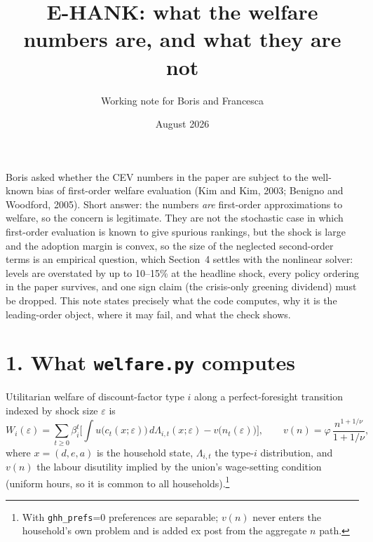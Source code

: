 \documentclass[11pt]{article}
\title{\vspace{-1.2cm}E-HANK: what the welfare numbers are, and what they are not\vspace{-0.4cm}}
\author{Working note for Boris and Francesca}
\date{August 2026}
\begin{document}
\maketitle
\vspace{-0.6cm}

\noindent Boris asked whether the CEV numbers in the paper are subject to the well-known bias of first-order welfare evaluation (Kim and Kim, 2003; Benigno and Woodford, 2005). Short answer: the numbers \emph{are} first-order approximations to welfare, so the concern is legitimate. They are not the stochastic case in which first-order evaluation is known to give spurious rankings, but the shock is large and the adoption margin is convex, so the size of the neglected second-order terms is an empirical question, which Section~4 settles with the nonlinear solver: levels are overstated by up to 10--15\% at the headline shock, every policy ordering in the paper survives, and one sign claim (the crisis-only greening dividend) must be dropped. This note states precisely what the code computes, why it is the leading-order object, where it may fail, and what the check shows.

\section*{1. What \texttt{welfare.py} computes}

Utilitarian welfare of discount-factor type $i$ along a perfect-foresight transition indexed by shock size $\varepsilon$ is
\begin{equation}
W_i(\varepsilon)=\sum_{t\ge 0}\beta_i^{t}\Big[\int u\big(c_t(x;\varepsilon)\big)\,d\Lambda_{i,t}(x;\varepsilon)-v\big(n_t(\varepsilon)\big)\Big],
\qquad v(n)=\varphi\,\frac{n^{1+1/\nu}}{1+1/\nu},
\label{eq:W}
\end{equation}
where $x=(d,e,a)$ is the household state, $\Lambda_{i,t}$ the type-$i$ distribution, and $v(n)$ the labour disutility implied by the union's wage-setting condition (uniform hours, so it is common to all households).\footnote{With \texttt{ghh\_prefs}=0 preferences are separable; $v(n)$ never enters the household's own problem and is added ex post from the aggregate $n$ path.}
\end{document}
